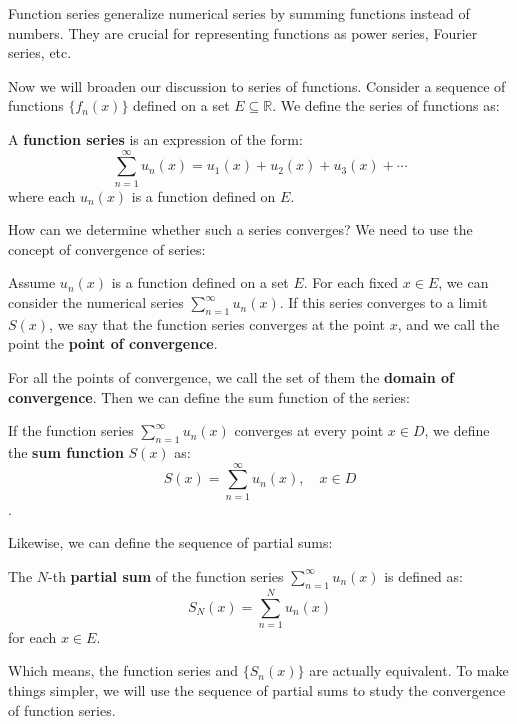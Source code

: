 Function series generalize numerical series by summing functions instead of numbers. They are crucial for representing functions as power series, Fourier series, etc.

Now we will broaden our discussion to series of functions. Consider a sequence of functions $\{f_n(x)\}$ defined on a set $E \subseteq \mathbb{R}$. We define the series of functions as:

\begin{definition}
A \textbf{function series} is an expression of the form:
\[ \sum_{n=1}^{\infty} u_n(x) = u_1(x) + u_2(x) + u_3(x) + \cdots \]
where each $u_n(x)$ is a function defined on $E$.
\end{definition}

How can we determine whether such a series converges? We need to use the concept of convergence of series:

\begin{definition}
    Assume $u_n(x)$ is a function defined on a set $E$. For each fixed $x \in E$, we can consider the numerical series $\sum_{n=1}^{\infty} u_n(x)$. If this series converges to a limit $S(x)$, we say that the function series converges at the point $x$, and we call the point the \textbf{point of convergence}.
\end{definition}

For all the points of convergence, we call the set of them the \textbf{domain of convergence}. Then we can define the sum function of the series:

\begin{definition}
If the function series $\sum_{n=1}^{\infty} u_n(x)$ converges at every point $x \in D$, we define the \textbf{sum function} $S(x)$ as:
\[ S(x) = \sum_{n=1}^{\infty} u_n(x), \quad x \in D \].
\end{definition}

Likewise, we can define the sequence of partial sums:

\newpage

\begin{definition}
The $N$-th \textbf{partial sum} of the function series $\sum_{n=1}^{\infty} u_n(x)$ is defined as:
\[ S_N(x) = \sum_{n=1}^{N} u_n(x) \]
for each $x \in E$.
\end{definition}

Which means, the function series and $\{S_n(x)\}$ are actually equivalent. To make things simpler, we will use the sequence of partial sums to study the convergence of function series.

